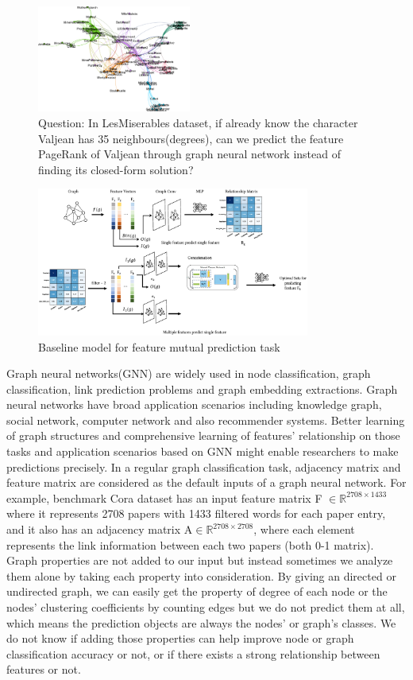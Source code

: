 \documentclass[sigconf]{acmart}
\begin{document}
\begin{figure}[!h]
    \centering
    \includegraphics[width = 0.45\textwidth]{fig/LesMiserables.eps}
    \caption{Question: In LesMiserables dataset, if already know the character Valjean has 35 neighbours(degrees), can we predict the feature PageRank of Valjean through graph neural network 
    instead of finding its closed-form solution?  }
\end{figure}

\begin{figure}
    \centering
    \includegraphics[width=0.8\textwidth]{output.eps}
    \caption{Baseline model for feature mutual prediction task}
\end{figure}


 Graph neural networks(GNN) are widely used in node classification, graph classification, link prediction problems and graph embedding extractions. Graph neural networks have broad application scenarios including knowledge graph, social network, computer network and also recommender systems. Better learning of graph structures and comprehensive learning of features' relationship on those tasks and application scenarios based on GNN might enable researchers to make predictions precisely. In a regular graph classification task, adjacency matrix and feature matrix are considered as the default inputs of a graph neural network. For example, benchmark Cora dataset has an input feature matrix F  $\in \mathbb{R}^{2708 \times1433}$ where it represents 2708 papers with 1433 filtered words for each paper entry, and it also has an adjacency matrix A$ \in \mathbb{R}^{2708 \times2708}$, 
where each element represents the link information between each two papers (both 0-1 matrix). Graph properties are not added to our input but instead sometimes we analyze them alone by taking each property into consideration. By giving an directed or undirected graph, we can easily get the property of degree of each node or the nodes' clustering coefficients by counting edges but we do not predict them at all, which means the prediction objects are always the nodes' or graph's classes. We do not know if adding those properties can help improve node or graph classification accuracy or not, or if there exists a strong relationship between features or not. 
\end{document}
